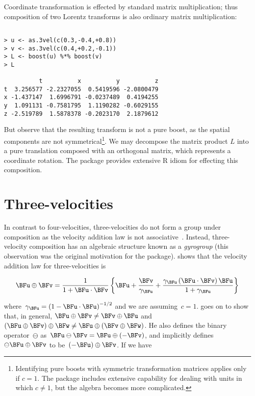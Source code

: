 \documentclass[ijoc,nonblindrev]{informs3} %
\begin{document}
Coordinate transformation is effected by standard matrix
multiplication; thus composition of two Lorentz transforms is also
ordinary matrix multiplication:

\begin{verbatim}

> u <- as.3vel(c(0.3,-0.4,+0.8))
> v <- as.3vel(c(0.4,+0.2,-0.1))
> L <- boost(u) %*% boost(v)
> L

          t          x          y          z
t  3.256577 -2.2327055  0.5419596 -2.0800479
x -1.437147  1.6996791 -0.0237489  0.4194255
y  1.091131 -0.7581795  1.1190282 -0.6029155
z -2.519789  1.5878378 -0.2023170  2.1879612

\end{verbatim}

But observe that the resulting transform is not a pure boost, as the
spatial components are not symmetrical\footnote{Identifying pure
  boosts with symmetric transformation matrices applies only if $c=1$.
  The package includes extensive capability for dealing with units in
  which $c\neq 1$, but the algebra becomes more complicated.}.  We may
decompose the matrix product $L$ into a pure translation composed with
an orthogonal matrix, which represents a coordinate rotation.  The
package provides extensive R idiom for effecting this composition.

\section{Three-velocities}

In contrast to four-velocities, three-velocities do not form a group
under composition as the velocity addition law is not
associative~\citep{ungar2006}.  Instead, three-velocity composition
has an algebraic structure known as a {\em gyrogroup} (this
observation was the original motivation for the package).
\citeauthor{ungar2006} shows that the velocity addition law for
three-velocities is

\begin{equation}
\BFu\oplus\BFv= \frac{1}{1+\BFu\cdot\BFv} \left\{ \BFu +
\frac{\BFv}{\gamma_\BFu} + \frac{\gamma_\BFu
  \left(\BFu\cdot\BFv\right)\BFu}{1+\gamma_\BFu} \right\}
\end{equation}
   
where~$\gamma_\BFu=\left(1-\BFu\cdot\BFu\right)^{-1/2}$ and we are
assuming~$c=1$.  \citeauthor{ungar2006} goes on to show that, in
general, $\BFu\oplus\BFv\neq\BFv\oplus\BFu$
and~$(\BFu\oplus\BFv)\oplus\BFw\neq\BFu\oplus(\BFv\oplus\BFw)$.  He also
defines the binary operator~$\ominus$
as~$\BFu\ominus\BFv=\BFu\oplus\left(-\BFv\right)$, and implicitly
defines~$\ominus\BFu\oplus\BFv$ to be~$\left(-\BFu\right)\oplus\BFv$.  If
we have
\end{document}
